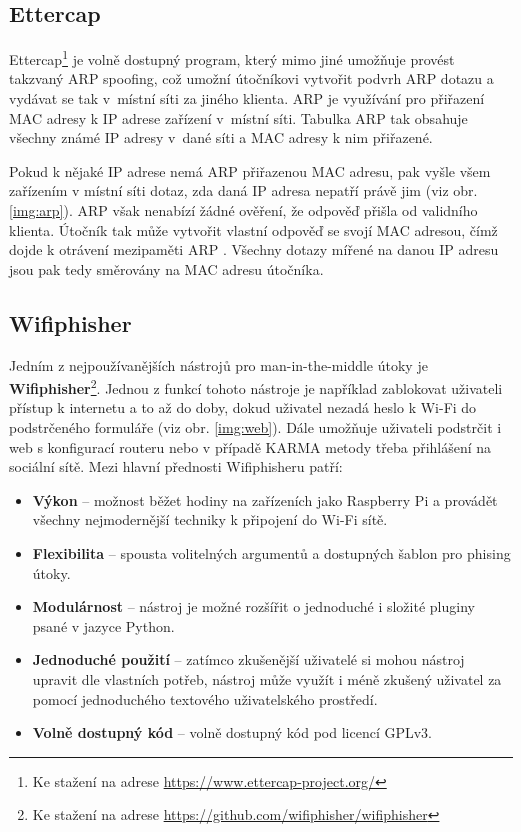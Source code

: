 \subsection{Ettercap}
Ettercap\footnote{Ke stažení na adrese \url{https://www.ettercap-project.org/}} je volně dostupný program, který mimo jiné umožňuje provést takzvaný ARP spoofing, což umožní útočníkovi vytvořit podvrh ARP dotazu a vydávat se tak v~místní síti za jiného klienta. ARP je využívání pro přiřazení MAC adresy k IP adrese zařízení v~místní síti. Tabulka ARP tak obsahuje všechny známé IP adresy v~dané síti a MAC adresy k nim přiřazené. 

Pokud k nějaké IP adrese nemá ARP přiřazenou MAC adresu, pak vyšle všem zařízením v místní síti dotaz, zda daná IP adresa nepatří právě jim (viz obr. \ref{img:arp}). ARP však nenabízí žádné ověření, že odpověď přišla od validního klienta. Útočník tak může vytvořit vlastní odpověď se svojí MAC adresou, čímž dojde k otrávení mezipaměti ARP \cite{fleck2001wireless}. Všechny dotazy mířené na danou IP adresu jsou pak tedy směrovány na MAC adresu útočníka.

\subsection{Wifiphisher}
Jedním z nejpoužívanějších nástrojů pro man-in-the-middle útoky je \textbf{Wifiphisher}\footnote{Ke stažení na adrese \url{https://github.com/wifiphisher/wifiphisher}}. Jednou z funkcí tohoto nástroje je například zablokovat uživateli přístup k internetu a to až do doby, dokud uživatel nezadá heslo k Wi-Fi do podstrčeného formuláře (viz obr. \ref{img:web}). Dále umožňuje uživateli podstrčit i web s konfigurací routeru nebo v případě KARMA metody třeba přihlášení na sociální sítě. Mezi hlavní přednosti Wifiphisheru patří:

\begin{itemize}
  \item{\textbf{Výkon} -- možnost běžet hodiny na zařízeních jako Raspberry Pi a provádět všechny nejmodernější techniky k připojení do Wi-Fi sítě.}
  \item{\textbf{Flexibilita} -- spousta volitelných argumentů a dostupných šablon pro phising útoky.}
  \item{\textbf{Modulárnost} -- nástroj je možné rozšířit o jednoduché i složité pluginy psané v jazyce Python.}
  \item{\textbf{Jednoduché použití} -- zatímco zkušenější uživatelé si mohou nástroj upravit dle vlastních potřeb, nástroj může využít i méně zkušený uživatel za pomocí jednoduchého textového uživatelského prostředí.}
  \item{\textbf{Volně dostupný kód} -- volně dostupný kód pod licencí GPLv3.}
\end{itemize}

